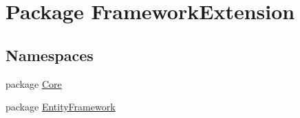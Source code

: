 \hypertarget{namespace_framework_extension}{\section{Package Framework\-Extension}
\label{namespace_framework_extension}
}
\subsection*{Namespaces}
\begin{DoxyCompactItemize}
\item 
package \hyperlink{namespace_framework_extension_1_1_core}{Core}
\item 
package \hyperlink{namespace_framework_extension_1_1_entity_framework}{Entity\-Framework}
\end{DoxyCompactItemize}
